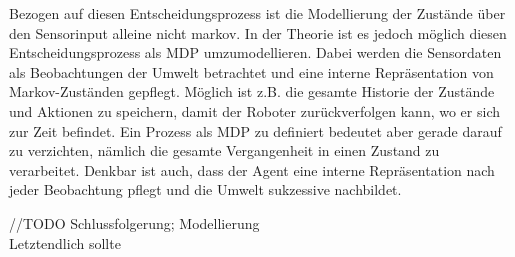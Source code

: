 Bezogen auf diesen Entscheidungsprozess ist die Modellierung der Zustände über den Sensorinput alleine nicht markov. In der Theorie ist es jedoch möglich diesen Entscheidungsprozess als MDP umzumodellieren. Dabei werden die Sensordaten als Beobachtungen der Umwelt betrachtet und eine interne Repräsentation von Markov-Zuständen gepflegt. Möglich ist z.B. die gesamte Historie der Zustände und Aktionen zu speichern, damit der Roboter zurückverfolgen kann, wo er sich zur Zeit befindet. Ein Prozess als MDP zu definiert bedeutet aber gerade darauf zu verzichten, nämlich die gesamte Vergangenheit in einen Zustand zu verarbeitet. Denkbar ist auch, dass der Agent eine interne Repräsentation nach jeder Beobachtung pflegt und die Umwelt suk­zes­si­ve nachbildet.
\par 
//TODO Schlussfolgerung; Modellierung
\\
Letztendlich sollte 


